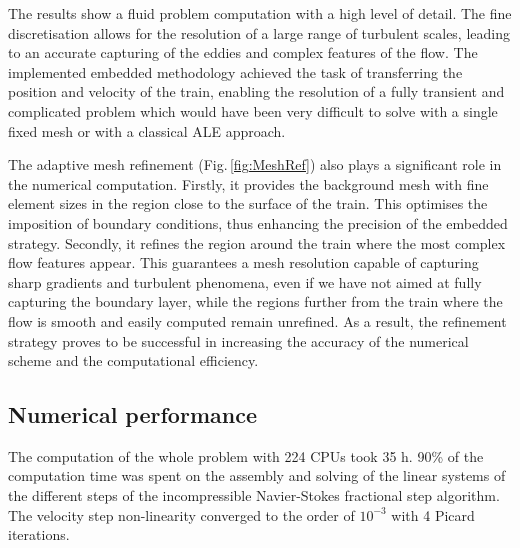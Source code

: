 \documentclass[11pt,a4paper,oneside,reqno]{amsart}
\newcommand{\Figu}[1]{Fig.\,\ref{fig:#1}}
\begin{document}
The results show a fluid problem computation with a high level of detail. The fine discretisation allows for the resolution of a large range of turbulent scales, leading to an accurate capturing of the eddies and complex features of the flow. The implemented embedded methodology achieved the task of transferring the position and velocity of the train, enabling the resolution of a fully transient and complicated problem which would have been very difficult to solve with a single fixed mesh or with a classical ALE approach.
 
The adaptive mesh refinement (\Figu{MeshRef}) also plays a significant role in the numerical computation. Firstly, it provides the background mesh with fine element sizes 
in the region close to the surface of the train. This optimises the imposition of boundary conditions, thus enhancing the precision of the embedded strategy. Secondly, it refines the region around the train where the most complex flow features appear. This guarantees a mesh resolution capable of capturing sharp gradients and turbulent phenomena, even if we have not aimed at fully capturing the boundary layer, while the regions further from the train where the flow is smooth and easily computed remain unrefined. As a result, the refinement strategy proves to be successful in increasing the accuracy of the numerical scheme and the computational efficiency.

\subsection{Numerical performance}


The computation of the whole problem with 224 CPUs took 35 h. 90\% of the computation time was spent on the assembly and solving of the linear systems of the different steps of the incompressible Navier-Stokes fractional step algorithm. The velocity step non-linearity converged to the order of $10^{-3}$ with 4 Picard iterations.
\end{document}
